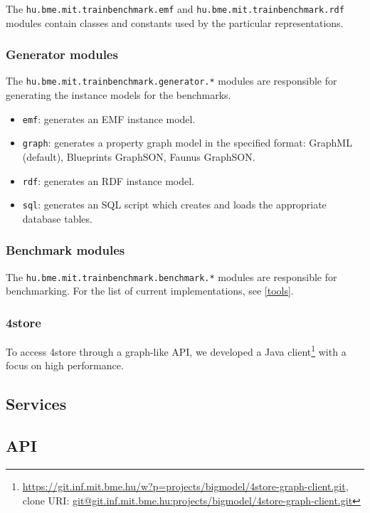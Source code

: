 The \texttt{hu.bme.mit.trainbenchmark.emf} and \texttt{hu.bme.mit.trainbenchmark.rdf} modules contain classes and constants used by the particular representations.



\subsubsection{Generator modules}

The \texttt{hu.bme.mit.trainbenchmark.generator.*} modules are responsible for generating the instance models for the benchmarks.

\begin{itemize}
  \item \texttt{emf}: generates an EMF instance model.
  \item \texttt{graph}: generates a property graph model in the specified format: GraphML (default), Blueprints GraphSON, Faunus GraphSON.
  \item \texttt{rdf}: generates an RDF instance model.
  \item \texttt{sql}: generates an SQL script which creates and loads the appropriate database tables.
\end{itemize}



\subsubsection{Benchmark modules}

The \texttt{hu.bme.mit.trainbenchmark.benchmark.*} modules are responsible for benchmarking. For the list of current implementations, see \autoref{tools}.

\subsubsection{4store}

To access 4store through a graph-like API, we developed a Java client\footnote{\url{https://git.inf.mit.bme.hu/w?p=projects/bigmodel/4store-graph-client.git}, \\ clone URI: \url{git@git.inf.mit.bme.hu:projects/bigmodel/4store-graph-client.git}} with a focus on high performance.

\subsection{Services}

\subsection{API}

